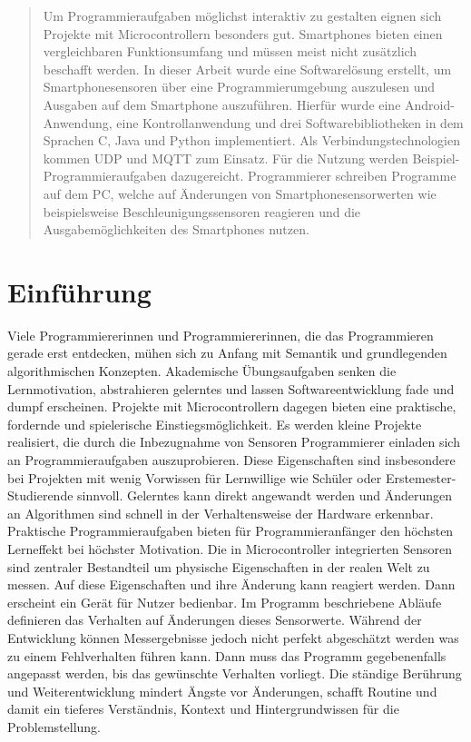\documentclass[11pt,a4paper]{report}
\begin{document}

\begin{abstract}
Um Programmieraufgaben möglichst interaktiv zu gestalten eignen sich Projekte mit Microcontrollern besonders gut.
Smartphones bieten einen vergleichbaren Funktionsumfang und müssen meist nicht zusätzlich beschafft werden.
In dieser Arbeit wurde eine Softwarelösung erstellt, um Smartphonesensoren über eine Programmierumgebung auszulesen und Ausgaben auf dem Smartphone auszuführen.
Hierfür wurde eine Android-Anwendung, eine Kontrollanwendung und drei Softwarebibliotheken in dem Sprachen C, Java und Python implementiert.
Als Verbindungstechnologien kommen UDP und MQTT zum Einsatz.
Für die Nutzung werden Beispiel-Programmieraufgaben dazugereicht.
Programmierer schreiben Programme auf dem PC, welche auf Änderungen von Smartphonesensorwerten wie beispielsweise Beschleunigungssensoren reagieren und die Ausgabemöglichkeiten des Smartphones nutzen.
\end{abstract}

\tableofcontents

\chapter{Einführung} \label{chap:intro}
Viele Programmiererinnen und Programmiererinnen, die das Programmieren gerade erst entdecken, mühen sich zu Anfang mit Semantik und grundlegenden algorithmischen Konzepten.
Akademische Übungsaufgaben senken die Lernmotivation, abstrahieren gelerntes und lassen Softwareentwicklung fade und dumpf erscheinen.
Projekte mit Microcontrollern dagegen bieten eine praktische, fordernde und spielerische Einstiegsmöglichkeit.
Es werden kleine Projekte realisiert, die durch die Inbezugnahme von Sensoren Programmierer einladen sich an Programmieraufgaben auszuprobieren.
Diese Eigenschaften sind insbesondere bei Projekten mit wenig Vorwissen für Lernwillige wie Schüler oder Erstemester-Studierende sinnvoll.
Gelerntes kann direkt angewandt werden und Änderungen an Algorithmen sind schnell in der Verhaltensweise der Hardware erkennbar.
Praktische Programmieraufgaben bieten für Programmieranfänger den höchsten Lerneffekt bei höchster Motivation.\cite{learning_computer_programming}
Die in Microcontroller integrierten Sensoren sind zentraler Bestandteil um physische Eigenschaften in der realen Welt zu messen.
Auf diese Eigenschaften und ihre Änderung kann reagiert werden.
Dann erscheint ein Gerät für Nutzer bedienbar.
Im Programm beschriebene Abläufe definieren das Verhalten auf Änderungen dieses Sensorwerte.
Während der Entwicklung können Messergebnisse jedoch nicht perfekt abgeschätzt werden was zu einem Fehlverhalten führen kann.
Dann muss das Programm gegebenenfalls angepasst werden, bis das gewünschte Verhalten vorliegt.
Die ständige Berührung und Weiterentwicklung mindert Ängste vor Änderungen, schafft Routine und damit ein tieferes Verständnis, Kontext und Hintergrundwissen für die Problemstellung.
\end{document}
